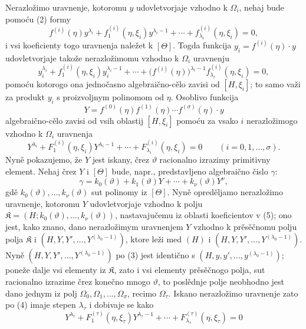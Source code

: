 \documentclass[11pt]{article}
\begin{document}
Nerazložimo uravnenje, kotoromu $y$ udovletvorjaje vzhodno k $\Omega_i$, nehaj
bude pomoću (2) formy
\[
 f^{(i)}(\eta)y^{\lambda_i}+f_1^{(i)}(\eta,\xi_i)y^{\lambda_i-1}
+\cdots+f_{\lambda_i}^{(i)}(\eta,\xi_i)=0,
\]
i vsi koeficienty togo uravnenja naležet k $[\Theta]$. Togda funkcija
$y_i=f^{(i)}(\eta)\cdot y$ udovletvorjaje takože nerazložimomu vzhodno k
$\Omega_i$ uravnenju
\[
 y_i^{\lambda_i}+f_1^{(i)}(\eta,\xi_i)y_i^{\lambda_i-1}
+\cdots+\bigl(f^{(i)}(\eta)\bigr)^{\lambda_i-1}
 f_{\lambda_i}^{(i)}(\eta,\xi_i)=0,
\]
pomoću kotorogo ona jednočasno algebraično-cělo zavisi od $[H,\xi_i]$; to samo
važi za produkt $y_i$ s proizvoljnym polinomom od $\eta$. Osoblivo funkcija
\begin{equation}
Y=f^{(0)}(\eta)f^{(1)}(\eta)\cdots f^{(\sigma)}(\eta)\cdot y
\tag{3}
\end{equation}
algebraično-cělo zavisi od vsih oblastij $[H,\xi_i]$ pomoću za vsako $i$
nerazložimogo vzhodno k $\Omega_i$ uravnenja
\begin{equation}
Y^{\lambda_i}+F_1^{(i)}(\eta,\xi_i)Y^{\lambda_i-1}
+\cdots+F_{\lambda_i}^{(i)}(\eta,\xi_i)=0
\qquad (i=0,1,\ldots,\sigma).
\tag{4}
\end{equation}
Nyně pokazujemo, že $Y$ jest iskany, črez $\vartheta$ racionalno izrazimy
primitivny element. Nehaj črez $Y$ i $[\Theta]$ bude, napr., predstavljeno
algebraično čislo $\gamma$:
\begin{equation}
\gamma=k_0(\vartheta)+k_1(\vartheta)Y+\cdots+k_\nu(\vartheta)Y^\nu,
\tag{5}
\end{equation}
gdě $k_0(\vartheta),\ldots,k_\nu(\vartheta)$ sut polinomy iz $[\Theta]$. Nyně
opreděljamo nerazložimo uravnenje, kotoromu $Y$ udovletvorjaje vzhodno k polju
$\mathfrak K=(H;k_0(\vartheta),\ldots,k_\nu(\vartheta))$, nastavajučemu iz
oblasti koeficientov v (5); ono jest, kako znano, dano nerazložimym uravnenjem
$Y$ vzhodno k prěsěčnomu polju polja $\mathfrak K$ i
$(H,Y,Y',\ldots,Y^{(\lambda_0-1)})$, ktore leži med $(H)$ i
$(H,Y,Y',\ldots,Y^{(\lambda_0-1)})$. Nyně
$(H,Y,Y',\ldots,Y^{(\lambda_0-1)})$ po (3) jest identično s
$(H,y,y',\ldots,y^{(\lambda_0-1)})$; poneže dalje vsi
elementy iz $\mathfrak K$, zato i vsi elementy prěsěčnogo polja, sut racionalno
izrazime črez konečno mnogo $\vartheta$, to poslědnje polje neobhodno jest dano
jednym iz polj $\Omega_0,\Omega_1,\ldots,\Omega_\sigma$, recimo
$\Omega_\tau$. Iskano nerazložimo uravnenje zato po (4) imaje stepen
$\lambda_\tau$ i dobivaje se kako
\begin{equation}
Y^{\lambda_\tau}+F_1^{(\tau)}(\eta,\xi_\tau)Y^{\lambda_\tau-1}
+\cdots+F_{\lambda_\tau}^{(\tau)}(\eta,\xi_\tau)=0
\tag{6}
\end{equation}
\end{document}

